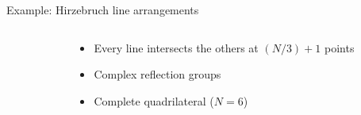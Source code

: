 \documentclass{beamer}
\begin{document}
\begin{frame}{Example: Hirzebruch line arrangements}
\begin{columns}
\begin{column}{.4\textwidth}
\begin{center}
{\begin{tikzpicture}
				\end{tikzpicture}
			}
		\end{center}
	\end{column}
	\begin{column}{.6\textwidth}
		\begin{itemize}
			\item Every line intersects the others at \((N/3)+1\) points
			\item Complex reflection groups  
			\item Complete quadrilateral (\(N=6\)) 
		\end{itemize}
	\end{column}
\end{columns}




\end{frame}
\end{document}
